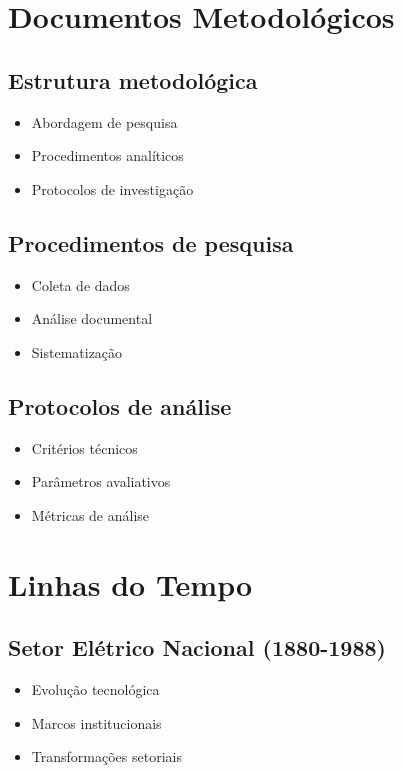 \documentclass[12pt,a4paper]{report}
\begin{document}
\chapter{Documentos Metodológicos}

\section{Estrutura metodológica}
\begin{itemize}[leftmargin=*]
    \item Abordagem de pesquisa
    \item Procedimentos analíticos
    \item Protocolos de investigação
\end{itemize}

\section{Procedimentos de pesquisa}
\begin{itemize}[leftmargin=*]
    \item Coleta de dados
    \item Análise documental
    \item Sistematização
\end{itemize}

\section{Protocolos de análise}
\begin{itemize}[leftmargin=*]
    \item Critérios técnicos
    \item Parâmetros avaliativos
    \item Métricas de análise
\end{itemize}

\chapter{Linhas do Tempo}

\section{Setor Elétrico Nacional (1880-1988)}
\begin{itemize}[leftmargin=*]
    \item Evolução tecnológica
    \item Marcos institucionais
    \item Transformações setoriais
\end{itemize}
\end{document}
